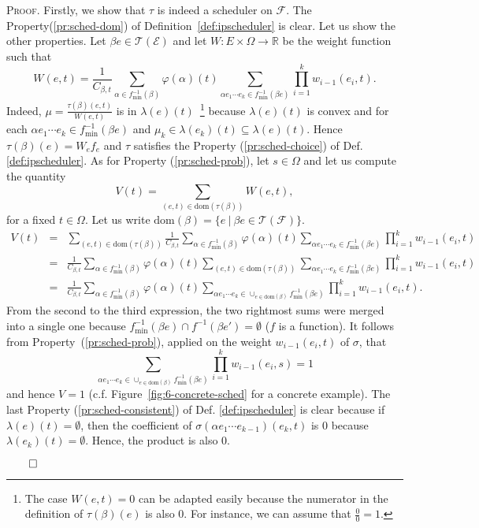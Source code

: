 \documentclass[review]{elsart}
\newenvironment{proof}{\par
\noindent
\textsc{Proof. }
\noindent}{\hfill\(\qed\)}
\newcommand{\Real}{{\mathbb R}}
\newcommand{\dom}{\mathrm{dom}}
\newcommand{\EE}{\mathcal{E}}
\newcommand{\FF}{\mathcal{F}}
\newcommand{\TT}{\mathcal{T}}
\newcommand{\Defs}[1]{Def. #1}
\begin{document}
\begin{proof}
Firstly, we show that $\tau$ is indeed a scheduler on $\FF$. The Property(\ref{pr:sched-dom}) of Definition~\ref{def:ipscheduler} is clear. Let us show the other properties. Let $\beta e{\in}\TT(\EE)$ and
let $W{:}E{\times}\Omega{\to}\Real$ be the weight function such that 
\[
	W(e,t) = \frac{1}{C_{\beta,t}}\sum_{\alpha{\in} f_{\min}^{-1}(\beta)}\varphi(\alpha)(t)\sum_{\alpha e_1\cdots e_k{\in} f_{\min}^{-1}(\beta e)}\prod_{i=1}^{k}w_{i-1}(e_i,t).
\]
Indeed, $\mu {=} \frac{\tau(\beta)(e,t)}{W(e,t)}$ is in $\lambda(e)(t)$~\footnote{The case $W(e,t) = 0$ can be adapted easily because the numerator in the definition of $\tau(\beta)(e)$ is also $0$. For instance, we can assume that $\frac{0}{0} = 1$.} because $\lambda(e)(t)$ is convex and for each $\alpha e_1\cdots e_k{\in}f_{\min}^{-1}(\beta e)$ and $\mu_k{\in}\lambda(e_k)(t){\subseteq}\lambda(e)(t)$.
Hence $\tau(\beta)(e) = W_ef_e$ and $\tau$ satisfies the Property (\ref{pr:sched-choice}) of \Defs{\ref{def:ipscheduler}}. As for Property (\ref{pr:sched-prob}), let $s{\in}\Omega$ and let us compute the quantity 
\[
	V(t) = \sum_{(e,t){\in}\dom(\tau(\beta))}W(e,t),
\]
for a fixed $t{\in}\Omega$. Let us write $\dom(\beta) = \{e \ | \ \beta e{\in}\TT(\FF) \}$.
\begin{eqnarray}
V(t) & = & \sum_{(e,t){\in}\dom(\tau(\beta))}\frac{1}{C_{\beta,t}}\sum_{\alpha{\in} f_{\min}^{-1}(\beta)}\varphi(\alpha)(t)\sum_{\alpha e_1\cdots e_k{\in} f_{\min}^{-1}(\beta e)}\prod_{i=1}^{k}w_{i-1}(e_i,t)\nonumber\\
& = & \frac{1}{C_{\beta,t}}\sum_{\alpha{\in} f_{\min}^{-1}(\beta)}\varphi(\alpha)(t)\sum_{(e,t){\in}\dom(\tau(\beta))}\sum_{\alpha e_1\cdots e_k{\in} f_{\min}^{-1}(\beta e)}\prod_{i=1}^{k}w_{i-1}(e_i,t)\nonumber\\
 & = & \frac{1}{C_{\beta,t}}\sum_{\alpha{\in} f_{\min}^{-1}(\beta)}\varphi(\alpha)(t)\sum_{\alpha e_1\cdots e_k{\in} {\cup}_{e{\in}\dom(\beta)}f_{\min}^{-1}(\beta e)}\prod_{i=1}^{k}w_{i-1}(e_i,t).\nonumber
\end{eqnarray}
From the second to the third expression, the two rightmost sums were merged into a single one because $f^{-1}_{\min}(\beta e){\cap} f^{-1}(\beta e') = \emptyset$ ($f$ is a function). It follows from Property~(\ref{pr:sched-prob}), applied on the weight $w_{i-1}(e_i,t)$ of $\sigma$, that
\[
	\sum_{\alpha e_1\cdots e_k{\in} {\cup}_{e{\in}\dom(\beta)}f_{\min}^{-1}(\beta e)}\prod_{i=1}^{k}w_{i-1}(e_i,s) = 1
\]	
and hence $V = 1$ (c.f. Figure~\ref{fig:6-concrete-sched} for a concrete example). The last Property (\ref{pr:sched-consistent}) of \Defs{\ref{def:ipscheduler}} is clear because if $\lambda(e)(t) = \emptyset$, then the coefficient of $\sigma(\alpha e_1\cdots e_{k-1})(e_k,t)$ is $0$ because $\lambda(e_k)(t) = \emptyset$. Hence, the product is also $0$.


\end{proof}
\end{document}
